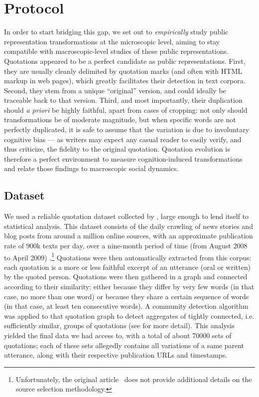 \section{Protocol} %
\label{sec:protocol}

In order to start bridging this gap, we set out to \emph{empirically} study public representation transformations at the microscopic level, aiming to stay compatible with macroscopic-level studies of these public representations.
Quotations appeared to be a perfect candidate as public representations.
First, they are usually cleanly delimited by quotation marks (and often with HTML markup in web pages), which greatly facilitates their detection in text corpora.
Second, they stem from a unique ``original'' version, and could ideally be traceable back to that version.
Third, and most importantly, their duplication should \emph{a priori} be highly faithful, apart from cases of cropping: not only should transformations be of moderate magnitude, but when specific words are not perfectly duplicated, it is safe to assume that the variation is due to involuntary cognitive bias --- as writers may expect any casual reader to easily verify, and thus criticize, the fidelity to the original quotation.
Quotation evolution is therefore a perfect environment to measure cognition-induced transformations and relate those findings to macroscopic social dynamics.

\subsection{Dataset}

We used a reliable quotation dataset collected by \citet{Leskovec09}, large enough to lend itself to statistical analysis.
This dataset consists of the daily crawling of news stories and blog posts from around a million online sources, with an approximate publication rate of 900k texts per day, over a nine-month period of time (from August 2008 to April 2009) \cite{Leskovec09-url}.\footnote{Unfortunately, the original article~\citep{Leskovec09} does not provide additional details on the source selection methodology.}
Quotations were then automatically extracted from this corpus: each quotation is a more or less faithful excerpt of an utterance (oral or written) by the quoted person.
Quotations were then gathered in a graph and connected according to their similarity: either because they differ by very few words (in that case, no more than one word) or because they share a certain sequence of words (in that case, at least ten consecutive words).
A community detection algorithm was applied to that quotation graph to detect aggregates of tightly connected, i.e. sufficiently similar, groups of quotations (see \citet{Leskovec09} for more detail).
This analysis yielded the final data we had access to, with a total of about \num{70000} sets of quotations; each of these sets allegedly contains all variations of a same parent utterance, along with their respective publication URLs and timestamps.

